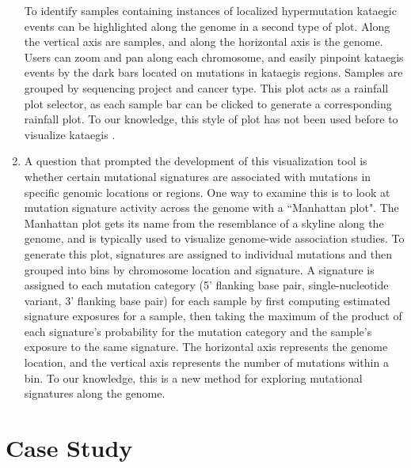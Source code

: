 \documentclass[12pt, letterpaper]{article}
\begin{document}
\begin{enumerate}
To identify samples containing instances of localized hypermutation kataegic events can be highlighted along the genome in a second type of plot.
Along the vertical axis are samples, and along the horizontal axis is the genome.
Users can zoom and pan along each chromosome, and easily pinpoint kataegis events by the dark bars located on mutations in kataegis regions.
Samples are grouped by sequencing project and cancer type.
This plot acts as a rainfall plot selector, as each sample bar can be clicked to generate a corresponding rainfall plot.
To our knowledge, this style of plot has not been used before to visualize kataegis .
    
\item A question that prompted the development of this visualization tool is whether certain mutational signatures are associated with mutations in specific genomic locations or regions.
One way to examine this is to look at mutation signature activity across the genome with a ``Manhattan plot".
The Manhattan plot gets its name from the resemblance of a skyline along the genome, and is typically used to visualize genome-wide association studies\cite{gibson2010hints}.
To generate this plot, signatures are assigned to individual mutations and then grouped into bins by chromosome location and signature.
A signature is assigned to each mutation category (5' flanking base pair, single-nucleotide variant, 3' flanking base pair) for each sample by first computing estimated signature exposures for a sample, then taking the maximum of the product of each signature's probability for the mutation category and the sample's exposure to the same signature.
The horizontal axis represents the genome location, and the vertical axis represents the number of mutations within a bin.
To our knowledge, this is a new method for exploring mutational signatures along the genome.

\end{enumerate}


\section{Case Study}
\end{document}
